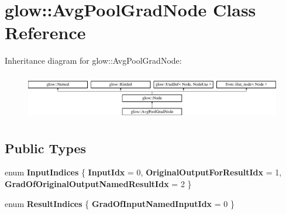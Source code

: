 \hypertarget{classglow_1_1_avg_pool_grad_node}{}\section{glow\+:\+:Avg\+Pool\+Grad\+Node Class Reference}
\label{classglow_1_1_avg_pool_grad_node}
Inheritance diagram for glow\+:\+:Avg\+Pool\+Grad\+Node\+:\begin{figure}[H]
\begin{center}
\leavevmode
\includegraphics[height=2.028986cm]{classglow_1_1_avg_pool_grad_node}
\end{center}
\end{figure}
\subsection*{Public Types}
\begin{DoxyCompactItemize}
\item 
\mbox{\label{classglow_1_1_avg_pool_grad_node_ae3ee89a98fb9adb1f0b803bee806f4bf}} 
enum {\bfseries Input\+Indices} \{ {\bfseries Input\+Idx} = 0, 
{\bfseries Original\+Output\+For\+Result\+Idx} = 1, 
{\bfseries Grad\+Of\+Original\+Output\+Named\+Result\+Idx} = 2
 \}
\item 
\mbox{\label{classglow_1_1_avg_pool_grad_node_a9dbdf3cfc977669bd528519bb84beaa1}} 
enum {\bfseries Result\+Indices} \{ {\bfseries Grad\+Of\+Input\+Named\+Input\+Idx} = 0
 \}
\end{DoxyCompactItemize}
